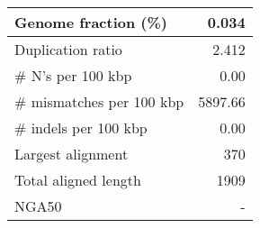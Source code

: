 \documentclass[12pt,a4paper]{article}
\begin{document}
\begin{table}[ht]
\begin{center}
\begin{tabular}{|l*{1}{|r}|}
Genome fraction (\%) & 0.034 \\ \hline
Duplication ratio & 2.412 \\ \hline
\# N's per 100 kbp & 0.00 \\ \hline
\# mismatches per 100 kbp & 5897.66 \\ \hline
\# indels per 100 kbp & 0.00 \\ \hline
Largest alignment & 370 \\ \hline
Total aligned length & 1909 \\ \hline
NGA50 & - \\ \hline
\end{tabular}
\end{center}
\end{table}
\end{document}
